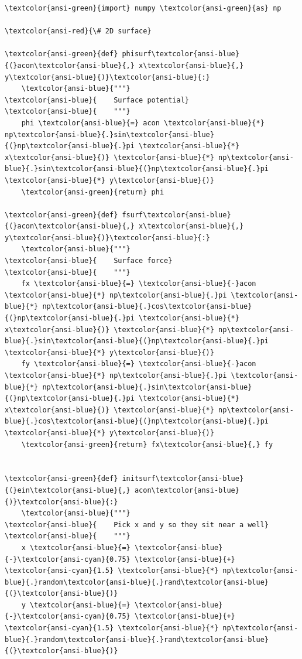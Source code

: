\documentclass[11pt]{article}
\begin{document}
    
    \begin{Verbatim}[commandchars=\\\{\}]
\textcolor{ansi-green}{import} numpy \textcolor{ansi-green}{as} np

\textcolor{ansi-red}{\# 2D surface}

\textcolor{ansi-green}{def} phisurf\textcolor{ansi-blue}{(}acon\textcolor{ansi-blue}{,} x\textcolor{ansi-blue}{,} y\textcolor{ansi-blue}{)}\textcolor{ansi-blue}{:}
    \textcolor{ansi-blue}{"""}
\textcolor{ansi-blue}{    Surface potential}
\textcolor{ansi-blue}{    """}
    phi \textcolor{ansi-blue}{=} acon \textcolor{ansi-blue}{*} np\textcolor{ansi-blue}{.}sin\textcolor{ansi-blue}{(}np\textcolor{ansi-blue}{.}pi \textcolor{ansi-blue}{*} x\textcolor{ansi-blue}{)} \textcolor{ansi-blue}{*} np\textcolor{ansi-blue}{.}sin\textcolor{ansi-blue}{(}np\textcolor{ansi-blue}{.}pi \textcolor{ansi-blue}{*} y\textcolor{ansi-blue}{)}
    \textcolor{ansi-green}{return} phi

\textcolor{ansi-green}{def} fsurf\textcolor{ansi-blue}{(}acon\textcolor{ansi-blue}{,} x\textcolor{ansi-blue}{,} y\textcolor{ansi-blue}{)}\textcolor{ansi-blue}{:}
    \textcolor{ansi-blue}{"""}
\textcolor{ansi-blue}{    Surface force}
\textcolor{ansi-blue}{    """}
    fx \textcolor{ansi-blue}{=} \textcolor{ansi-blue}{-}acon \textcolor{ansi-blue}{*} np\textcolor{ansi-blue}{.}pi \textcolor{ansi-blue}{*} np\textcolor{ansi-blue}{.}cos\textcolor{ansi-blue}{(}np\textcolor{ansi-blue}{.}pi \textcolor{ansi-blue}{*} x\textcolor{ansi-blue}{)} \textcolor{ansi-blue}{*} np\textcolor{ansi-blue}{.}sin\textcolor{ansi-blue}{(}np\textcolor{ansi-blue}{.}pi \textcolor{ansi-blue}{*} y\textcolor{ansi-blue}{)}
    fy \textcolor{ansi-blue}{=} \textcolor{ansi-blue}{-}acon \textcolor{ansi-blue}{*} np\textcolor{ansi-blue}{.}pi \textcolor{ansi-blue}{*} np\textcolor{ansi-blue}{.}sin\textcolor{ansi-blue}{(}np\textcolor{ansi-blue}{.}pi \textcolor{ansi-blue}{*} x\textcolor{ansi-blue}{)} \textcolor{ansi-blue}{*} np\textcolor{ansi-blue}{.}cos\textcolor{ansi-blue}{(}np\textcolor{ansi-blue}{.}pi \textcolor{ansi-blue}{*} y\textcolor{ansi-blue}{)}
    \textcolor{ansi-green}{return} fx\textcolor{ansi-blue}{,} fy


\textcolor{ansi-green}{def} initsurf\textcolor{ansi-blue}{(}ein\textcolor{ansi-blue}{,} acon\textcolor{ansi-blue}{)}\textcolor{ansi-blue}{:}
    \textcolor{ansi-blue}{"""}
\textcolor{ansi-blue}{    Pick x and y so they sit near a well}
\textcolor{ansi-blue}{    """}
    x \textcolor{ansi-blue}{=} \textcolor{ansi-blue}{-}\textcolor{ansi-cyan}{0.75} \textcolor{ansi-blue}{+} \textcolor{ansi-cyan}{1.5} \textcolor{ansi-blue}{*} np\textcolor{ansi-blue}{.}random\textcolor{ansi-blue}{.}rand\textcolor{ansi-blue}{(}\textcolor{ansi-blue}{)}
    y \textcolor{ansi-blue}{=} \textcolor{ansi-blue}{-}\textcolor{ansi-cyan}{0.75} \textcolor{ansi-blue}{+} \textcolor{ansi-cyan}{1.5} \textcolor{ansi-blue}{*} np\textcolor{ansi-blue}{.}random\textcolor{ansi-blue}{.}rand\textcolor{ansi-blue}{(}\textcolor{ansi-blue}{)}


\end{Verbatim}
\end{document}
